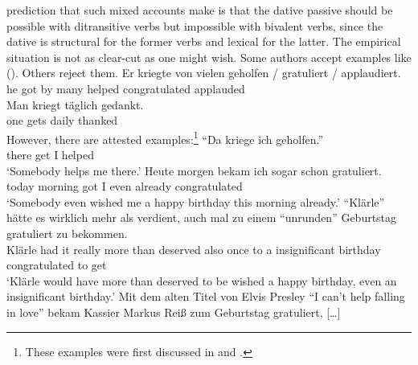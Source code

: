 prediction that such mixed accounts make is that the dative passive should be possible with
ditransitive verbs but impossible with bivalent verbs, since the dative is structural for the former
verbs and lexical for the latter. The empirical situation is not as clear-cut as one might
wish. Some authors accept examples like (). Others reject them.
\eal
\label{ex-helfen-with-dative-passive}
\ex 
\gll Er kriegte von vielen geholfen / gratuliert / applaudiert.\\
     he got by many helped {} congratulated {} applauded\\
\ex 
\gll Man kriegt täglich gedankt.\\
     one gets   daily thanked\\
\zl
However, there are attested examples:\footnote{
  These examples were first discussed in  and .
}
\eal
\label{ex-helfen-with-dative-passive-corpus}
\ex "`Da kriege ich geholfen."'\footnotemark\\
     \quotespace{}there get  I  helped\\
\glt `Somebody helps me there.'
\ex
\gll Heute morgen bekam ich sogar schon gratuliert.\footnotemark\\
     today morning got  I even already congratulated\\
\glt `Somebody even wished me a happy birthday this morning already.'
\ex
\gll "`Klärle"' hätte es wirklich mehr als verdient, auch mal zu einem "`unrunden"' Geburtstag gratuliert zu bekommen.\footnotemark\\
     Klärle had it really more than deserved also once to a insignificant birthday congratulated to get\\
\glt `Klärle would have more than deserved to be wished a happy birthday, even an insignificant birthday.'
\ex 
\gll Mit dem alten Titel von Elvis Presley "`I can't help falling in love"' bekam Kassier Markus Reiß zum Geburtstag gratuliert, [\ldots]\footnotemark\\
